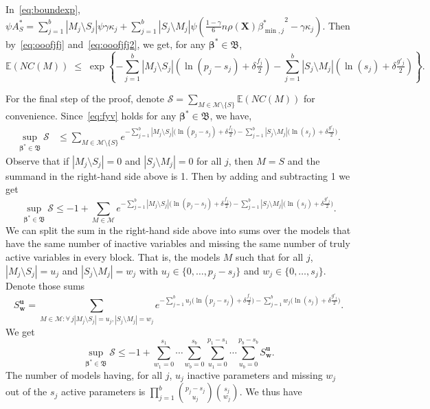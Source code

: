 \documentclass[
  12pt]{article}
\newcommand{\E}{\mathbb{E}}
\newcommand{\M}{\mathcal{M}}
\newcommand{\bu}{\mathbf{u}}
\newcommand{\bw}{\mathbf{w}}
\newcommand{\bbeta}{\boldsymbol{\beta}}
\newcommand{\bX}{\mathbf{X}}
\newcommand{\bB}{\mathfrak{B}}
\begin{document}
In~\eqref{eq:boundexp}, $\psi A^*_S=\sum_{j=1}^b|M_j \setminus S_j|\psi\gamma\kappa_j + \sum_{j=1}^b |S_j\setminus M_j |\psi\left(\tfrac{1-\gamma}{6} n \rho(\bX) {\beta^*_{\min,j}}^{2} - \gamma\kappa_j\right)$. Then by~\eqref{eq:ooofjfj} and~\eqref{eq:ooofjfj2}, we get, for any $\bbeta^*\in \bB$,
\begin{equation}\label{eq:fyv}
\E(NC(M))\;\leq\;\exp\left\{- \sum_{j=1}^b |M_j\setminus S_j|(\ln(p_j-s_j)+\delta \tfrac{f_j}{2})-\sum_{j=1}^b |S_j\setminus M_j|(\ln(s_j)+\delta \tfrac{g'_j}{2})\right\}.    
\end{equation}

For the final step of the proof, denote $\mathcal{S}= \sum_{M \in \M\setminus \{S\}} \E\left(NC(M)\right)$ for convenience. Since~\eqref{eq:fyv} holds for any $\bbeta^*\in \bB$, we have,
\begin{align*}
   \sup_{\bbeta^*\in \bB} \mathcal{S} &\leq \sum_{M \in \M\setminus \{S\}}e^{- \sum_{j=1}^b |M_j\setminus S_j|\big(\ln(p_j-s_j)+\delta \tfrac{f_j}{2}\big)-\sum_{j=1}^b |S_j\setminus M_j|\big(\ln(s_j)+\delta \tfrac{g'_j}{2}\big)}.
\end{align*}
Observe that if $|M_j\setminus S_j|=0$ and $|S_j\setminus M_j|=0$ for all $j$, then $M=S$ and the summand in the right-hand side above is 1. Then by adding and subtracting 1 we get
$$\sup_{\bbeta^*\in \bB} \mathcal{S} \leq -1+ \sum_{M \in \M}e^{- \sum_{j=1}^b |M_j\setminus S_j|\big(\ln(p_j-s_j)+\delta \tfrac{f_j}{2}\big)-\sum_{j=1}^b |S_j\setminus M_j|\big(\ln(s_j)+\delta \tfrac{g'_j}{2}\big)}.$$
We can split the sum in the right-hand side above into sums over the models that have the same number of inactive variables and missing the same number of truly active variables in every block. That is, the models $M$ such that for all $j$, $|M_j\setminus S_j|=u_j$ and $|S_j\setminus M_j|=w_j$ with $u_j \in \{0,\ldots,p_j-s_j\}$ and $w_j \in \{0,\ldots,s_j\}$. Denote those sums
$$S^{\bu}_{\bw}=\sum_{M \in \M:\forall \,j |M_j\setminus S_j|=u_j, |S_j\setminus M_j|=w_j } e^{- \sum_{j=1}^b u_j\big(\ln(p_j-s_j)+\delta \tfrac{f_j}{2}\big)-\sum_{j=1}^b w_j\big(\ln(s_j)+\delta \tfrac{g'_j}{2}\big)}.$$
We get
\begin{equation}\label{eq:uygfew}
    \sup_{\bbeta^*\in \bB} \mathcal{S} \leq -1+\sum_{w_1=0}^{s_1}\cdots\sum_{w_b=0}^{s_b}\sum_{u_1=0}^{p_1-s_1}\cdots\sum_{u_b=0}^{p_b-s_b}S^{\bu}_{\bw}.
\end{equation}
The number of models having, for all $j$, $u_j$ inactive parameters and missing $w_j$ out of the $s_j$ active parameters
is $\prod_{j=1}^b {\binom{p_j-s_j}{u_j}}{\binom{s_j}{w_j}}$. We thus have
\end{document}
